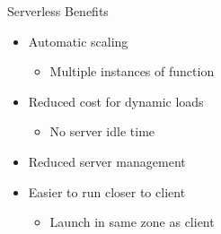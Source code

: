 \documentclass{slide}
\begin{document}


\begin{frame}{Serverless Benefits}
\vspace{1pt}
{\huge
\begin{itemize}
    \item<1-> Automatic scaling
    \begin{itemize}
        \LARGE\item Multiple instances of function
    \end{itemize}
    \vspace{1mm}
    \item<2-> Reduced cost for dynamic loads
    \begin{itemize}
        \LARGE\item No server idle time
    \end{itemize}
    \item<3-> Reduced server management
    \vspace{1mm}
    \item<4-> Easier to run closer to client
    \begin{itemize}
        \LARGE\item Launch in same zone as client 
    \end{itemize}
\end{itemize}
}
\end{frame}
\end{document}
